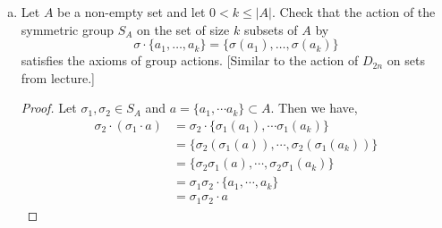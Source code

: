 \documentclass[11pt, reqno]{amsart}
\theoremstyle{plain}
\theoremstyle{definition}
\theoremstyle{example}
\begin{document}
\begin{enumerate}[1.]
\begin{enumerate}[(a)]
\begin{proof}
So our map is injective. Now let $S \in \mathcal{P}(G) \setminus \emptyset$. Observe, that since $G$ is a group, for every $s \in S$, there exists an element $g^{-1}sg \in G$. Hence, we can define the set $R \subset G \setminus \emptyset$ such that every element $r \in R$ is defined to be $g^{-1}sg$ for some $s \in S$. Ensure that each $s$ is used to define exactly one $r$. Then, we have for all $r \in R$,
\begin{align*}
grg^{-1} &= g(g^{-1}sg)g^{-1}\\
&= s
\end{align*}

Hence, we have that $gRg^{-1} = S$, and so our map is surjective and hence bijective.\\

Now consider again sets $S, R \in \mathcal{P}(G) \setminus \emptyset$. Then we have
\begin{align*}
gSRg^{-1} &= gS(g^{-1}g)Rg^{-1}\\
&= (gSg^{-1})(gRg^{-1})
\end{align*}

So the map is homomorphism and hence and isomorphishm. Thus, again from problem 2b(iii) on Homework 2, we can assert that 
\begin{align*}
|S| = |gSg^{-1}|
\end{align*}

for every $S \in \mathcal{P}(G) \setminus \emptyset$

\end{proof}
\newpage
\item \label{subsets} 
Let $A$ be a non-empty set and let $0<k \leq |A|$. Check that the action of the  symmetric group $S_A$  on the set of size $k$ subsets of $A$ by 
$$\sigma\cdot \{a_1, \dots, a_k\} = \{\sigma(a_1), \dots, \sigma(a_k)\}$$
satisfies the axioms of group actions. \hfill {\small[Similar to the action of $D_{2n}$ on sets from lecture.]}

\begin{proof}
Let $\sigma_1, \sigma_2 \in S_A$ and $a = \{a_1, \cdots a_k\} \subset A$. Then we have,
\begin{align*}
\sigma_2 \cdot (\sigma_1 \cdot a) &= \sigma_2 \cdot \{\sigma_1(a_1), \cdots \sigma_1(a_k)\}\\
&= \{\sigma_2(\sigma_1(a)), \cdots, \sigma_2(\sigma_1(a_k))\}\\
&= \{\sigma_2\sigma_1(a), \cdots, \sigma_2\sigma_1(a_k)\}\\
&= \sigma_1 \sigma_2 \cdot \{a_1, \cdots, a_k\}\\
&= \sigma_1 \sigma_2 \cdot a
\end{align*}


\end{proof}
\end{enumerate}
\end{enumerate}
\end{document}
